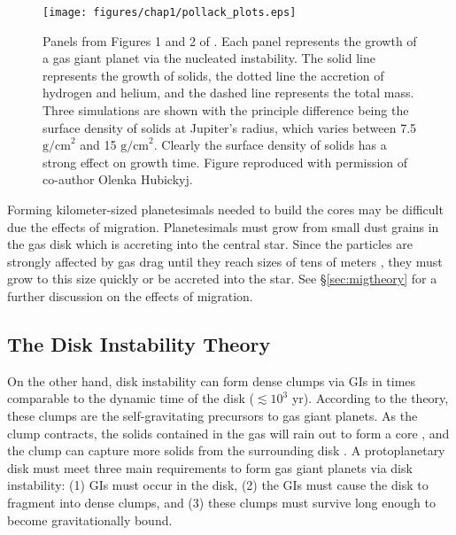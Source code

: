 \begin{figure}[p]
\begin{center}
\texttt{[image: figures/chap1/pollack\_plots.eps]}
\caption[Figures from \citet{pollack1996}.]{Panels from Figures 1 and 2 of \citet{pollack1996}. Each panel represents the growth of a gas giant planet via the nucleated instability. The solid line represents the growth of solids, the dotted line the accretion of hydrogen and helium, and the dashed line represents the total mass. Three simulations are shown with the principle difference being the surface density of solids at Jupiter's radius, which varies between 7.5 $\mathrm{g/cm}^2$ and 15 $\mathrm{g/cm}^2$. Clearly the surface density of solids has a strong effect on growth time. Figure reproduced with permission of co-author Olenka Hubickyj.}
\label{fig:pollack}
\end{center}
\end{figure}

Forming kilometer-sized planetesimals needed to build the cores may be difficult due the effects of migration. Planetesimals must grow from small dust grains in the gas disk which is accreting into the central star. Since the particles are strongly affected by gas drag until they reach sizes of tens of meters \citep{weiden1977}, they must grow to this size quickly or be accreted into the star. See \S\ref{sec:migtheory} for a further discussion on the effects of migration.

\subsection{The Disk Instability Theory}\label{sec:Intro:disktheory}

On the other hand, disk instability \citep{kup1951,cameron1978,boss1997,durisen2007} can form dense clumps via GIs in times comparable to the dynamic time of the disk ($\lesssim 10^3$ yr). According to the theory, these clumps are the self-gravitating precursors to gas giant planets. As the clump contracts, the solids contained in the gas will rain out to form a core \citep{slattery1980,helled2008a,helled2008b}, and the clump can capture more solids from the surrounding disk \citep{helled2006,guillot2010}. A protoplanetary disk must meet three main requirements to form gas giant planets via disk instability: (1) GIs must occur in the disk, (2) the GIs must cause the disk to fragment into dense clumps, and (3) these clumps must survive long enough to become gravitationally bound. 

